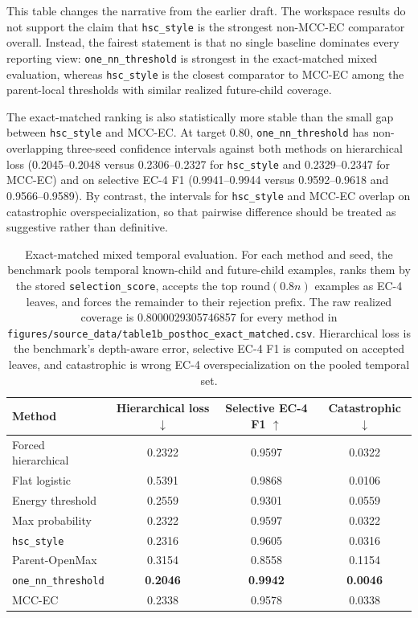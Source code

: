 \documentclass{article}
\newcommand{\method}{MCC-EC\xspace}
\begin{document}
This table changes the narrative from the earlier draft. The workspace results do not support the claim that \texttt{hsc\_style} is the strongest non-\method comparator overall. Instead, the fairest statement is that no single baseline dominates every reporting view: \texttt{one\_nn\_threshold} is strongest in the exact-matched mixed evaluation, whereas \texttt{hsc\_style} is the closest comparator to \method among the parent-local thresholds with similar realized future-child coverage.

The exact-matched ranking is also statistically more stable than the small gap between \texttt{hsc\_style} and \method. At target 0.80, \texttt{one\_nn\_threshold} has non-overlapping three-seed confidence intervals against both methods on hierarchical loss (0.2045--0.2048 versus 0.2306--0.2327 for \texttt{hsc\_style} and 0.2329--0.2347 for \method) and on selective EC-4 F1 (0.9941--0.9944 versus 0.9592--0.9618 and 0.9566--0.9589). By contrast, the intervals for \texttt{hsc\_style} and \method overlap on catastrophic overspecialization, so that pairwise difference should be treated as suggestive rather than definitive.

\begin{table}[t]
\caption{Exact-matched mixed temporal evaluation. For each method and seed, the benchmark pools temporal known-child and future-child examples, ranks them by the stored \texttt{selection\_score}, accepts the top $\mathrm{round}(0.8n)$ examples as EC-4 leaves, and forces the remainder to their rejection prefix. The raw realized coverage is 0.8000029305746857 for every method in \texttt{figures/source\_data/table1b\_posthoc\_exact\_matched.csv}. Hierarchical loss is the benchmark's depth-aware error, selective EC-4 F1 is computed on accepted leaves, and catastrophic is wrong EC-4 overspecialization on the pooled temporal set.}
\label{tab:exact80}
\centering
\small
\begin{tabular}{lccc}
\toprule
Method & Hierarchical loss $\downarrow$ & Selective EC-4 F1 $\uparrow$ & Catastrophic $\downarrow$ \\
\midrule
Forced hierarchical & 0.2322 & 0.9597 & 0.0322 \\
Flat logistic & 0.5391 & 0.9868 & 0.0106 \\
Energy threshold & 0.2559 & 0.9301 & 0.0559 \\
Max probability & 0.2322 & 0.9597 & 0.0322 \\
\texttt{hsc\_style} & 0.2316 & 0.9605 & 0.0316 \\
Parent-OpenMax & 0.3154 & 0.8558 & 0.1154 \\
\texttt{one\_nn\_threshold} & \textbf{0.2046} & \textbf{0.9942} & \textbf{0.0046} \\
\method & 0.2338 & 0.9578 & 0.0338 \\
\bottomrule
\end{tabular}
\end{table}
\end{document}

